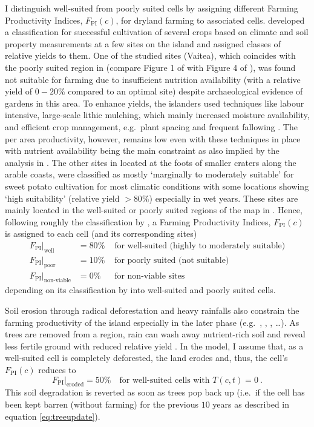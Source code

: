 I distinguish well-suited from poorly suited cells by assigning different Farming Productivity Indices, $F_\text{PI}(c)$, for dryland farming to associated cells.
\citet{Louwagie2006} developed a classification for successful cultivation of several crops based on climate and soil property measurements at a few sites on the island and assigned classes of relative yields to them. 
One of the studied sites (Vaitea), which coincides with the poorly suited region in \citet{Puleston2017} (compare Figure 1 of \citet{Louwagie2006} with Figure 4 of \citet{Puleston2017}), was found not suitable for farming due to insufficient nutrition availability (with a relative yield of $0-20\%$ compared to an optimal site) despite archaeological evidence of gardens in this area.
To enhance yields, the islanders used techniques like labour intensive, large-scale lithic mulching, which mainly increased moisture availability, and efficient crop management, e.g.\ plant spacing and frequent fallowing \citep{Louwagie2006}.
The per area productivity, however, remains low even with these techniques in place with nutrient availability being the main constraint as also implied by the analysis in \citet{Puleston2017}.
The other sites in \citet{Louwagie2006} located at the foots of smaller craters along the arable coasts, were classified as mostly `marginally to moderately suitable' for sweet potato cultivation for most climatic conditions with some locations showing `high suitability' (relative yield $>80\%$) especially in wet years. 
These sites are mainly located in the well-suited or poorly suited regions of the map in \citet{Puleston2017}.
Hence, following roughly the classification by \citet{Louwagie2006}, a Farming Productivity Indices, $F_\text{PI}(c)$ is assigned to each cell (and its corresponding sites)
\begin{eqnarray*}
	F_\text{PI}|_\text{well} & = 80\% & \text{ for well-suited (highly to moderately suitable)}\\
	F_\text{PI}|_\text{poor} & = 10\%  & \text{ for poorly suited (not suitable)}\\
	F_\text{PI}|_\text{non-viable} & = 0\% & \text{ for non-viable sites}
\end{eqnarray*}
depending on its classification by \citet{Puleston2017} into well-suited and poorly suited cells.

Soil erosion through radical deforestation and heavy rainfalls also constrain the farming productivity of the island especially in the later phase (e.g.\ \citet{Brander1998}, \citet{Mieth2005}, \citet{Bahn2017}, \ldots).
As trees are removed from a region, rain can wash away nutrient-rich soil and reveal less fertile ground with reduced relative yield \citet{Mieth2005}.
In the model, I assume that, as a well-suited cell is completely deforested, the land erodes and, thus, the cell's $F_\text{PI}(c)$ reduces to 
\begin{equation}
F_\text{PI}|_\text{eroded}=50\% \quad \text{for well-suited cells with } T(c,t)=0 \ .
\end{equation}
This soil degradation is reverted as soon as trees pop back up (i.e.\ if the cell has been kept barren (without farming) for the previous $10$ years as described in equation \ref{eq:treeupdate}).

